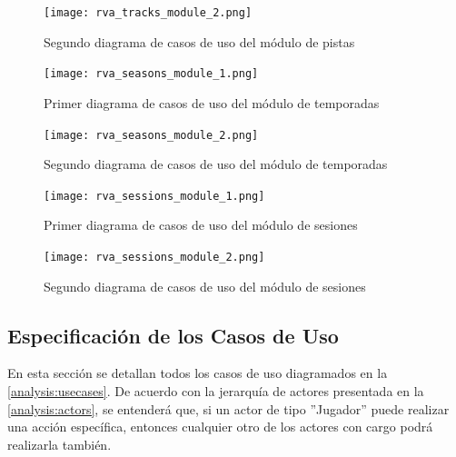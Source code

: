 \begin{figure}[H]
  \begin{center}
    \texttt{[image: rva\_tracks\_module\_2.png]}
  \end{center}
  \caption[Segundo diagrama de casos de uso del módulo de pistas]{Segundo diagrama de casos de uso del módulo de pistas}
  \label{fig:rva_tracks_module_2}
\end{figure}

\begin{figure}[H]
  \begin{center}
    \texttt{[image: rva\_seasons\_module\_1.png]}
  \end{center}
  \caption[Primer diagrama de casos de uso del módulo de temporadas]{Primer diagrama de casos de uso del módulo de temporadas}
  \label{fig:rva_seasons_module_1}
\end{figure}

\begin{figure}[H]
  \begin{center}
    \texttt{[image: rva\_seasons\_module\_2.png]}
  \end{center}
  \caption[Segundo diagrama de casos de uso del módulo de temporadas]{Segundo diagrama de casos de uso del módulo de temporadas}
  \label{fig:rva_seasons_module_2}
\end{figure}

\begin{figure}[H]
  \begin{center}
    \texttt{[image: rva\_sessions\_module\_1.png]}
  \end{center}
  \caption[Primer diagrama de casos de uso del módulo de sesiones]{Primer diagrama de casos de uso del módulo de sesiones}
  \label{fig:rva_sessions_module_1}
\end{figure}

\begin{figure}[H]
  \begin{center}
    \texttt{[image: rva\_sessions\_module\_2.png]}
  \end{center}
  \caption[Segundo diagrama de casos de uso del módulo de sesiones]{Segundo diagrama de casos de uso del módulo de sesiones}
  \label{fig:rva_sessions_module_2}
\end{figure}

\newpage

\subsection{Especificación de los Casos de Uso}
\label{analysis:usecases:specification}
En esta sección se detallan todos los casos de uso diagramados en la \autoref{analysis:usecases}. De acuerdo con la jerarquía de actores presentada en la \autoref{analysis:actors}, se entenderá que, si un actor de tipo ''Jugador'' puede realizar una acción específica, entonces cualquier otro de los actores con cargo podrá realizarla también.

